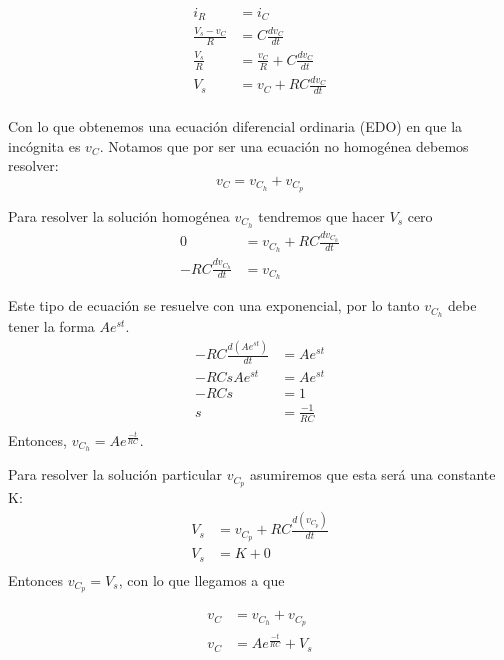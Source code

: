 \begin{example}
\begin{align*}
    i_R               & =   i_C                             \\
    \frac{V_s-v_C}{R} & =    C\frac{dv_C}{dt}               \\
    \frac{V_s}{R}     & = \frac{v_C}{R}+   C\frac{dv_C}{dt} \\
    V_s               & = v_C+   RC\frac{dv_C}{dt}          \\
\end{align*}

Con lo que obtenemos una ecuación diferencial ordinaria (EDO) en que la incógnita es $v_C$. Notamos que por ser una ecuación no homogénea debemos resolver:
\begin{equation*}
    v_C=v_{C_h}+ v_{C_p}
\end{equation*}

Para resolver la solución homogénea $v_{C_h}$ tendremos que hacer $V_s$ cero
\begin{align*}
    0                      & = v_{C_h} +  RC\frac{dv_{C_h}}{dt} \\
    -RC\frac{dv_{C_h}}{dt} & = v_{C_h}
\end{align*}

Este tipo de ecuación se resuelve con una exponencial, por lo tanto $v_{C_h}$ debe tener la forma $Ae^{st}$.
\begin{align*}
    -RC\frac{d(Ae^{st})}{dt} & = Ae^{st}       \\
    -RCsAe^{st}              & = Ae^{st}       \\
    -RCs                     & = 1             \\
    s                        & = \frac{-1}{RC} \\
\end{align*}
Entonces, $v_{C_h}=Ae^{\frac{-t}{RC}}$.

Para resolver la solución particular $v_{C_p}$ asumiremos que esta será una constante K:
\begin{align*}
    V_s & = v_{C_p} +  RC\frac{d(v_{C_p})}{dt} \\
    V_s & = K + 0                              \\
\end{align*}
Entonces  $v_{C_p}=V_s$, con lo que llegamos a que

\begin{align*}
    v_C & =v_{C_h}+ v_{C_p}        \\
    v_C & =Ae^{\frac{-t}{RC}}+ V_s \\
\end{align*}


\end{example}
